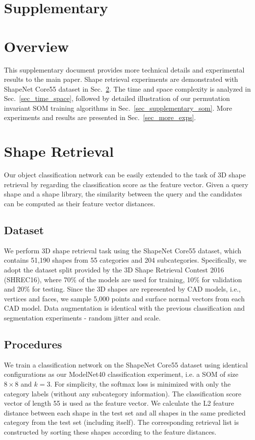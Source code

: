 \documentclass[10pt,twocolumn,letterpaper]{article}
\begin{document}
\section*{Supplementary}

\appendix
\iffalse\fi\section{Overview}
This supplementary document provides more technical details and experimental results to the main paper. Shape retrieval experiments are demonstrated with ShapeNet Core55 dataset in Sec.~\ref{sec_shape_retrieval}. The time and space complexity is analyzed in Sec.~\ref{sec_time_space}, followed by detailed illustration of our permutation invariant SOM training algorithms in Sec.~\ref{sec_supplementary_som}. More experiments and results are presented in Sec.~\ref{sec_more_exps}.

\section{Shape Retrieval}\label{sec_shape_retrieval}
Our object classification network can be easily extended to the task of 3D shape retrieval by regarding the classification score as the feature vector. Given a query shape and a shape library, the similarity between the query and the candidates can be computed as their feature vector distances.

\subsection{Dataset}
We perform 3D shape retrieval task using the ShapeNet Core55 dataset, which contains 51,190 shapes from 55 categories and 204 subcategories. Specifically, we adopt the dataset split provided by the 3D Shape Retrieval Contest 2016 (SHREC16), where 70\% of the models are used for training, 10\% for validation and 20\% for testing. Since the 3D shapes are represented by CAD models, i.e., vertices and faces, we sample 5,000 points and surface normal vectors from each CAD model. Data augmentation is identical with the previous classification and segmentation experiments - random jitter and scale.

\subsection{Procedures}
We train a classification network on the ShapeNet Core55 dataset using identical configurations as our ModelNet40 classification experiment, i.e. a SOM of size $8\times 8$ and $k=3$. For simplicity, the softmax loss is minimized with only the category labels (without any subcategory information). The classification score vector of length 55 is used as the feature vector. We calculate the L2 feature distance between 
each shape in the test set 
and all shapes in the same predicted category from the test set (including itself). The corresponding retrieval list is constructed by sorting these shapes according to the feature distances.
\end{document}
